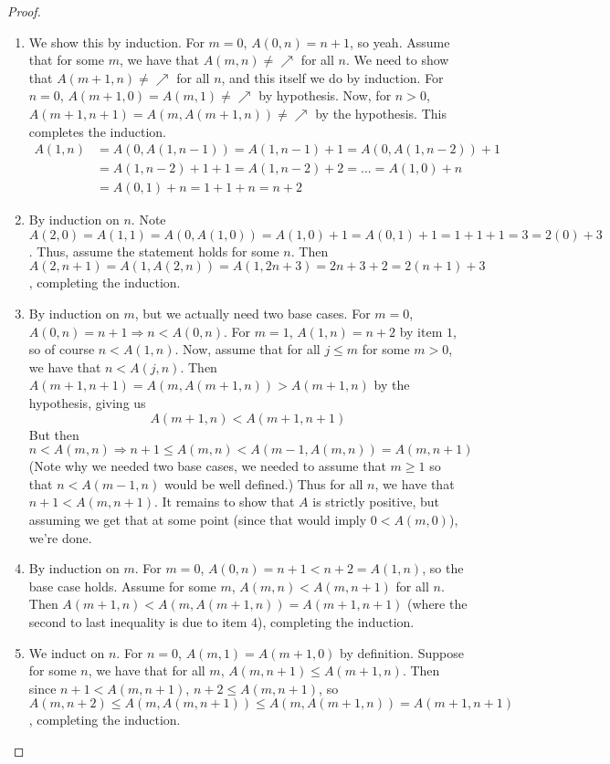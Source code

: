 \begin{proof}
    \begin{enumerate}
        \item We show this by induction. For $m=0$, $A(0,n) = n+1$, so yeah. Assume that for some $m$, we have that $A(m,n) \neq \nearrow$ for all $n$. We need to show that $A(m+1,n) \neq \nearrow$ for all $n$, and this itself we do by induction. For $n=0$, $A(m+1,0) = A(m,1) \neq \nearrow$ by hypothesis. Now, for $n>0$, $A(m+1,n+1) = A(m,A(m+1,n)) \neq \nearrow$ by the hypothesis. This completes the induction.
        \begin{align}
        A(1,n) &= A(0,A(1,n-1)) = A(1,n-1)+1 = A(0,A(1,n-2))+1 \\
               &= A(1,n-2)+1+1 = A(1,n-2)+2 = ... = A(1,0)+n \\
               &= A(0,1) + n = 1+1+n = n+2
        \end{align}
        \item By induction on $n$. Note $A(2,0) = A(1,1) = A(0,A(1,0)) = A(1,0)+1 = A(0,1)+1 = 1+1+1 = 3 = 2(0)+3$. Thus, assume the statement holds for some $n$. Then $A(2,n+1) = A(1,A(2,n)) = A(1,2n+3) = 2n+3+2 = 2(n+1)+3$, completing the induction.
        \item By induction on $m$, but we actually need two base cases. For $m=0$, $A(0,n)=n+1 \Rightarrow n < A(0,n)$. For $m=1$, $A(1,n) = n+2$ by item $1$, so of course $n < A(1,n)$. Now, assume that for all $j \leq m$ for some $m > 0$, we have that $n < A(j,n)$. Then $A(m+1,n+1) = A(m,A(m+1,n)) > A(m+1,n)$ by the hypothesis, giving us 
        \[ A(m+1,n) < A(m+1,n+1) \]
        But then
        \[ n < A(m,n) \Rightarrow n+1 \leq A(m,n) < A(m-1,A(m,n)) = A(m,n+1) \]
        (Note why we needed two base cases, we needed to assume that $m \geq 1$ so that $n < A(m-1,n)$ would be well defined.) Thus for all $n$, we have that $n+1 < A(m,n+1)$. It remains to show that $A$ is strictly positive, but assuming we get that at some point (since that would imply $0 < A(m,0)$), we're done.
        \item By induction on $m$. For $m=0$, $A(0,n) = n+1 < n+2 = A(1,n)$, so the base case holds. Assume for some $m$, $A(m,n) < A(m,n+1)$ for all $n$. Then $A(m+1,n) < A(m,A(m+1,n)) = A(m+1,n+1)$ (where the second to last inequality is due to item $4$), completing the induction.
        \item We induct on $n$. For $n=0$, $A(m,1) = A(m+1,0)$ by definition. Suppose for some $n$, we have that for all $m$, $A(m,n+1) \leq A(m+1,n)$. Then since $n+1 < A(m,n+1)$, $n+2 \leq A(m,n+1)$, so $A(m,n+2) \leq A(m,A(m,n+1)) \leq A(m,A(m+1,n))=A(m+1,n+1)$, completing the induction.

\end{enumerate}
\end{proof}
